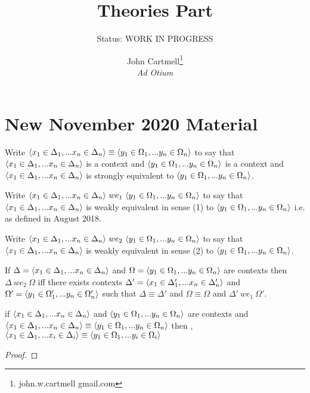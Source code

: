 \documentclass[10pt,a4paper]{scrartcl}
\title{ Theories Part}
\author{John Cartmell\footnote{john.w.cartmell gmail.com}\\ \normalsize{\textit{Ad Otium}}}
\subtitle{Status: \normalsize{WORK IN PROGRESS}}
\begin{document}
\maketitle

\section{New November 2020 Material}

\newcommand{\sEquiv}[2]{#1 \equiv #2}
\newcommand{\wEquivOne}[2]{#1\ we_1\ #2}
\newcommand{\wEquivTwo}[2]{#1\ we_2\ #2}


Write $\sEquiv{\encxDelta{n}}{\encyOmega{n}}$ to say that $\langle x_1 \in \Delta_1,... x_{n} \in \Delta_{n}\rangle$ is a context and $\langle y_1 \in \Omega_1,... y_{n} \in \Omega_{n}\rangle$ is a context and $\langle x_1 \in \Delta_1,... x_{n} \in \Delta_{n}\rangle$ is strongly equivalent to $\langle y_1 \in \Omega_1,... y_{n} \in \Omega_{n}\rangle$.

Write $\wEquivOne{\encxDelta{n}}{\encyOmega{n}}$ to say that $\langle x_1 \in \Delta_1,... x_{n} \in \Delta_{n}\rangle$ is weakly equivalent in sense (1) to $\langle y_1 \in \Omega_1,... y_{n} \in \Omega_{n}\rangle$ i.e. as defined in August 2018.

Write $\wEquivTwo{\encxDelta{n}}{\encyOmega{n}}$ to say that $\langle x_1 \in \Delta_1,... x_{n} \in \Delta_{n}\rangle$ is weakly equivalent in sense (2) to $\langle y_1 \in \Omega_1,... y_{n} \in \Omega_{n}\rangle$.

\begin{definition}
If $\Delta=\langle x_1 \in \Delta_1,... x_{n} \in \Delta_{n}\rangle$ and $\Omega = \langle y_1 \in \Omega_1,... y_{n} \in \Omega_{n}\rangle$ are contexts then $\wEquivTwo{\Delta}{\Omega}$ iff there exists contexts $\Delta' = \langle x_1 \in \Delta'_1,... x_{n} \in \Delta'_{n}\rangle$ and $\Omega' = \langle y_1 \in \Omega'_1,... y_{n} \in \Omega'_{n}\rangle$ such that
$\sEquiv{\Delta}{\Delta'}$ and $\sEquiv{\Omega}{\Omega}$ and $\wEquivOne{\Delta'}{\Omega'}$.
\end{definition}

\begin{lemma}
if $\langle x_1 \in \Delta_1,... x_{n} \in \Delta_{n}\rangle$ 
and $\langle y_1 \in \Omega_1,... y_{n} \in \Omega_{n}\rangle$ are contexts 
and $\sEquiv{\encxDelta{n}}{\encyOmega{n}}$ 
then \foreachi,  $\sEquiv{\encxDelta{i}}{\encyOmega{i}}$
\end{lemma}
\begin{proof}
\end{proof}
\end{document}
